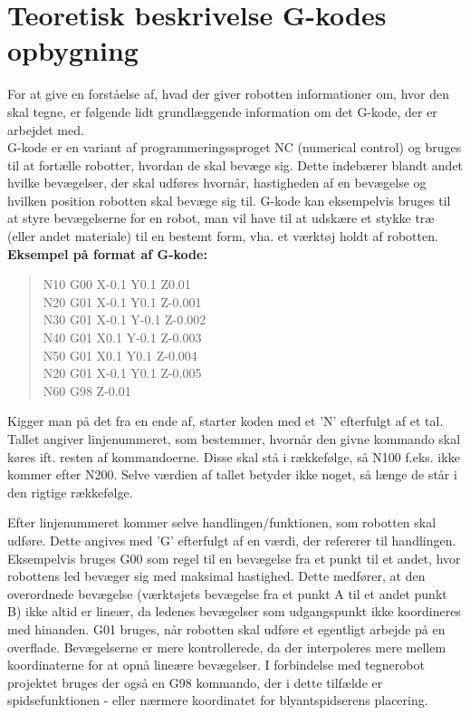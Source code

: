 \section{Teoretisk beskrivelse G-kodes opbygning}
For at give en forståelse af, hvad der giver robotten informationer om, hvor den skal tegne, er følgende lidt grundlæggende information om det G-kode, der er arbejdet med.\\
G-kode er en variant af programmeringssproget NC (numerical control) og bruges til at fortælle robotter, hvordan de skal bevæge sig. Dette indebærer blandt andet hvilke bevægelser, der skal udføres hvornår, hastigheden af en bevægelse og hvilken position robotten skal bevæge sig til. G-kode kan eksempelvis bruges til at styre bevægelserne for en robot, man vil have til at udskære et stykke træ (eller andet materiale) til en bestemt form, vha. et værktøj holdt af robotten.\\
\textbf{Eksempel på format af G-kode:}

\begin{quote}
N10 G00 X-0.1 Y0.1 Z0.01\\
N20 G01 X-0.1 Y0.1 Z-0.001\\
N30 G01 X-0.1 Y-0.1 Z-0.002\\
N40 G01 X0.1 Y-0.1 Z-0.003\\
N50 G01 X0.1 Y0.1 Z-0.004\\
N20 G01 X-0.1 Y0.1 Z-0.005\\
N60 G98 Z-0.01
\end{quote}

Kigger man på det fra en ende af, starter koden med et ’N’ efterfulgt af et tal. Tallet angiver linjenummeret, som bestemmer, hvornår den givne kommando skal køres ift. resten af kommandoerne. Disse skal stå i rækkefølge, så N100 f.eks. ikke kommer efter N200. Selve værdien af tallet betyder ikke noget, så længe de står i den rigtige rækkefølge.

Efter linjenummeret kommer selve handlingen/funktionen, som robotten skal udføre. Dette angives med ’G’ efterfulgt af en værdi, der refererer til handlingen. Eksempelvis bruges G00 som regel til en bevægelse fra et punkt til et andet, hvor robottens led bevæger sig med maksimal hastighed. Dette medfører, at den overordnede bevægelse (værktøjets bevægelse fra et punkt A til et andet punkt B) ikke altid er lineær, da ledenes bevægelser som udgangspunkt ikke koordineres med hinanden. G01 bruges, når robotten skal udføre et egentligt arbejde på en overflade. Bevægelserne er mere kontrollerede, da der interpoleres mere mellem koordinaterne for at opnå lineære bevægelser. I forbindelse med tegnerobot projektet bruges der også en G98 kommando, der i dette tilfælde er spidsefunktionen - eller nærmere koordinatet for blyantspidserens placering.

